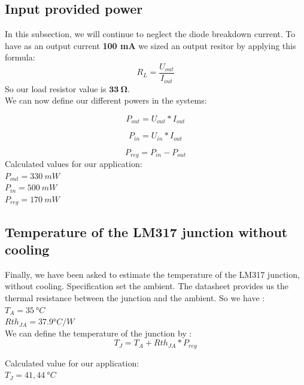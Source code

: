 \subsection{Input provided power} \label{ssec:num03}
{
In this subsection, we will continue to neglect the diode breakdown current. To have as an output current \textbf{100 mA} we sized an output resitor by applying this formula:
\begin{equation}
    R_L = \frac{U_{out}}{I_{out}}
\end{equation}
So our load resistor value is $ \mathbf{ 33 \ \boldsymbol{\Omega} } $. \\
\clearpage
We can now define our different powers in the systems:

\begin{equation}
    P_{out} = U_{out}*I_{out}
\end{equation}

\begin{equation}
    P_{in} = U_{in}*I_{out}
\end{equation}

\begin{equation}
    P_{reg} = P_{in} - P_{out}
\end{equation}
Calculated values for our application:\\
$ P_{out} = 330 \ mW $ \\
$ P_{in}  = 500 \ mW $ \\
$ P_{reg} = 170 \ mW $ \\
}

\subsection{Temperature of the LM317 junction without cooling} \label{ssec:num05}
{
Finally, we have been asked to estimate the temperature of the LM317 junction, without cooling. Specification set the ambient. The datasheet provides us the thermal resistance between the junction and the ambient. So we have : \\
$ T_{A} = 35 \ °C $ \\
$ Rth_{JA} = 37.9 °C/W $\\
We can define the temperature of the junction by :
\begin{equation*}
	T_{J} = T_{A} + Rth_{JA} * P_{reg}
\end{equation*}

Calculated value for our application:\\
$ T_{J} = 41,44 \ °C $ \\

}

